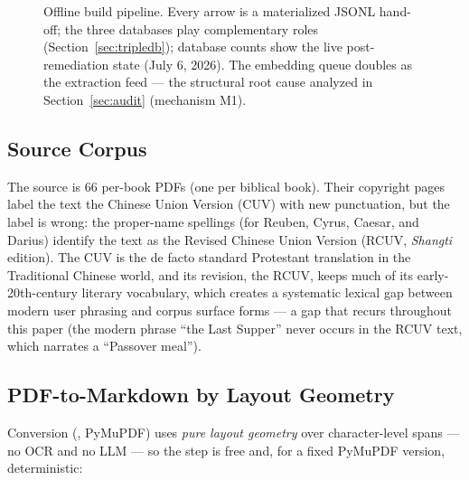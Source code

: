 \begin{figure}[!t]
{%
}
\caption{Offline build pipeline. Every arrow is a materialized JSONL
hand-off; the three databases play complementary roles
(Section~\ref{sec:tripledb}); database counts show the live
post-remediation state (July 6, 2026). The embedding queue doubles as
the extraction feed --- the structural root cause analyzed in
Section~\ref{sec:audit} (mechanism M1).}
\label{fig:offline}
\end{figure}

\subsection{Source Corpus}

The source is 66 per-book PDFs (one per biblical book). Their copyright
pages label the text the Chinese Union Version (CUV) with new
punctuation, but the label is wrong: the proper-name spellings (\eg for
Reuben, Cyrus, Caesar, and Darius) identify the text as the Revised
Chinese Union Version (RCUV, \emph{Shangti} edition). The CUV is the de
facto standard Protestant translation in the Traditional Chinese world,
and its revision, the RCUV, keeps much of its early-20th-century literary
vocabulary, which creates a systematic lexical
gap between modern user phrasing and corpus surface forms --- a gap that
recurs throughout this paper (\eg the modern phrase ``the Last Supper''
never occurs in the RCUV text, which narrates a ``Passover meal'').

\subsection{PDF-to-Markdown by Layout Geometry}

Conversion (, PyMuPDF) uses \emph{pure layout
geometry} over character-level spans --- no OCR and no LLM --- so the step
is free and, for a fixed PyMuPDF version, deterministic:

